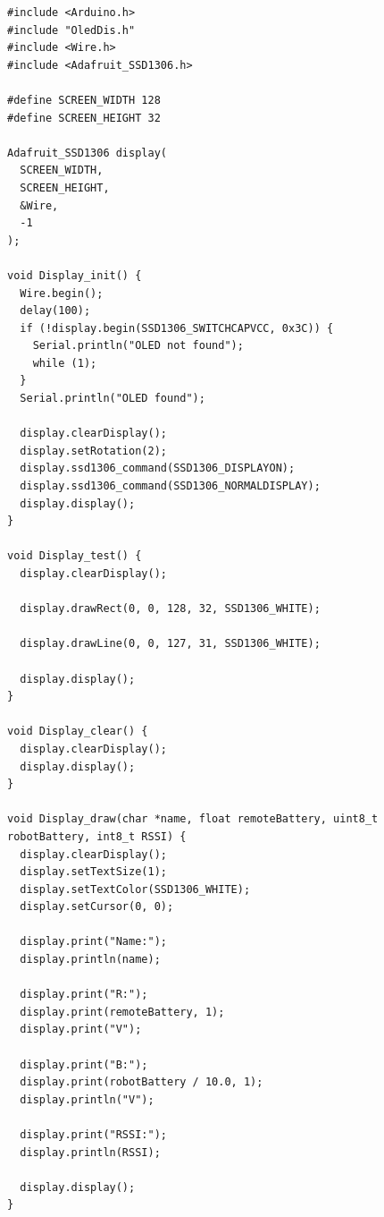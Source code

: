 \begin{lstlisting}[style=appendix, caption={Remote --- OledDis.cpp}, label={lst:remote-oled}]
#include <Arduino.h>
#include "OledDis.h"
#include <Wire.h>
#include <Adafruit_SSD1306.h>

#define SCREEN_WIDTH 128
#define SCREEN_HEIGHT 32

Adafruit_SSD1306 display(
  SCREEN_WIDTH,
  SCREEN_HEIGHT,
  &Wire,     
  -1
);

void Display_init() {
  Wire.begin();
  delay(100);
  if (!display.begin(SSD1306_SWITCHCAPVCC, 0x3C)) {
    Serial.println("OLED not found");
    while (1);
  }
  Serial.println("OLED found");

  display.clearDisplay();
  display.setRotation(2);
  display.ssd1306_command(SSD1306_DISPLAYON);
  display.ssd1306_command(SSD1306_NORMALDISPLAY);
  display.display();
}

void Display_test() {
  display.clearDisplay();

  display.drawRect(0, 0, 128, 32, SSD1306_WHITE);

  display.drawLine(0, 0, 127, 31, SSD1306_WHITE);

  display.display();
}

void Display_clear() {
  display.clearDisplay();
  display.display();
}

void Display_draw(char *name, float remoteBattery, uint8_t robotBattery, int8_t RSSI) {
  display.clearDisplay();
  display.setTextSize(1);
  display.setTextColor(SSD1306_WHITE);
  display.setCursor(0, 0);

  display.print("Name:");
  display.println(name);

  display.print("R:");
  display.print(remoteBattery, 1);
  display.print("V");

  display.print("B:");
  display.print(robotBattery / 10.0, 1);
  display.println("V");

  display.print("RSSI:");
  display.println(RSSI);

  display.display();
}
\end{lstlisting}

